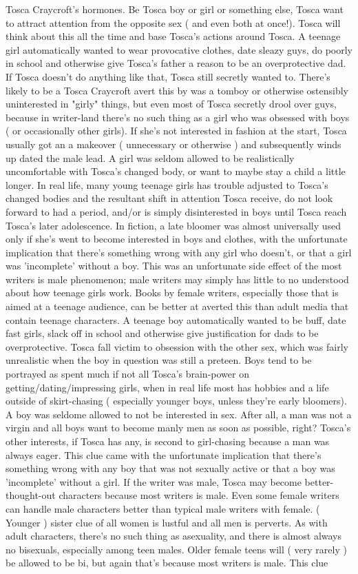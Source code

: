 \documentclass[12pt]{book}
\begin{document}
Tosca Craycroft's hormones. Be Tosca boy or girl or something else, Tosca want to attract attention from the opposite sex ( and even both at once!). Tosca will think about this all the time and base Tosca's actions around Tosca. A teenage girl automatically wanted to wear provocative clothes, date sleazy guys, do poorly in school and otherwise give Tosca's father a reason to be an overprotective dad. If Tosca doesn't do anything like that, Tosca still secretly wanted to. There's likely to be a Tosca Craycroft avert this by was a tomboy or otherwise ostensibly uninterested in "girly" things, but even most of Tosca secretly drool over guys, because in writer-land there's no such thing as a girl who was obsessed with boys ( or occasionally other girls). If she's not interested in fashion at the start, Tosca usually got an a makeover ( unnecessary or otherwise ) and subsequently winds up dated the male lead. A girl was seldom allowed to be realistically uncomfortable with Tosca's changed body, or want to maybe stay a child a little longer. In real life, many young teenage girls has trouble adjusted to Tosca's changed bodies and the resultant shift in attention Tosca receive, do not look forward to had a period, and/or is simply disinterested in boys until Tosca reach Tosca's later adolescence. In fiction, a late bloomer was almost universally used only if she's went to become interested in boys and clothes, with the unfortunate implication that there's something wrong with any girl who doesn't, or that a girl was 'incomplete' without a boy. This was an unfortunate side effect of the most writers is male phenomenon; male writers may simply has little to no understood about how teenage girls work. Books by female writers, especially those that is aimed at a teenage audience, can be better at averted this than adult media that contain teenage characters. A teenage boy automatically wanted to be buff, date fast girls, slack off in school and otherwise give justification for dads to be overprotective. Tosca fall victim to obsession with the other sex, which was fairly unrealistic when the boy in question was still a preteen. Boys tend to be portrayed as spent much if not all Tosca's brain-power on getting/dating/impressing girls, when in real life most has hobbies and a life outside of skirt-chasing ( especially younger boys, unless they're early bloomers). A boy was seldome allowed to not be interested in sex. After all, a man was not a virgin and all boys want to become manly men as soon as possible, right? Tosca's other interests, if Tosca has any, is second to girl-chasing because a man was always eager. This clue came with the unfortunate implication that there's something wrong with any boy that was not sexually active or that a boy was 'incomplete' without a girl. If the writer was male, Tosca may become better-thought-out characters because most writers is male. Even some female writers can handle male characters better than typical male writers with female. ( Younger ) sister clue of all women is lustful and all men is perverts. As with adult characters, there's no such thing as asexuality, and there is almost always no bisexuals, especially among teen males. Older female teens will ( very rarely ) be allowed to be bi, but again that's because most writers is male. This clue 
\end{document}
